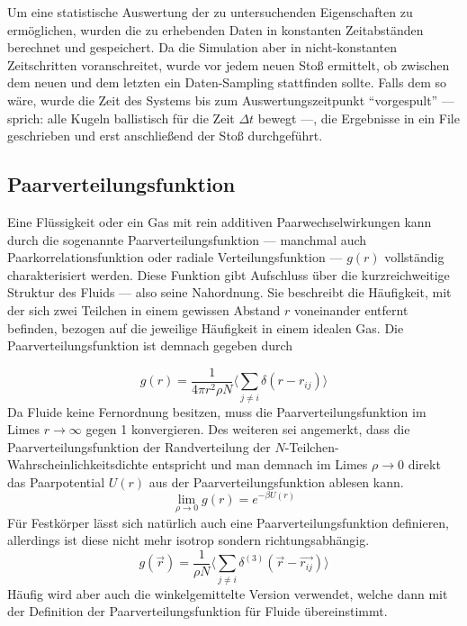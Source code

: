 Um eine statistische Auswertung der zu untersuchenden Eigenschaften zu ermöglichen, wurden die zu erhebenden Daten in konstanten Zeitabständen berechnet und gespeichert. Da die Simulation aber in nicht-konstanten Zeitschritten voranschreitet, wurde vor jedem neuen Stoß ermittelt, ob zwischen dem neuen und dem letzten ein Daten-Sampling stattfinden sollte. Falls dem so wäre, wurde die Zeit des Systems bis zum Auswertungszeitpunkt ``vorgespult'' --- sprich: alle Kugeln ballistisch für die Zeit $\Delta t$ bewegt ---, die Ergebnisse in ein File geschrieben und erst anschließend der Stoß durchgeführt.   
\subsection{Paarverteilungsfunktion}\label{sec:paarverteilung}
Eine Flüssigkeit oder ein Gas mit rein additiven Paarwechselwirkungen kann durch die sogenannte Paarverteilungsfunktion --- manchmal auch Paarkorrelationsfunktion oder radiale Verteilungsfunktion --- $g(r)$ vollständig charakterisiert werden. Diese Funktion gibt Aufschluss über die kurzreichweitige Struktur des Fluids --- also seine Nahordnung. Sie beschreibt die Häufigkeit, mit der sich zwei Teilchen in einem gewissen Abstand $r$ voneinander entfernt befinden, bezogen auf die jeweilige Häufigkeit in einem idealen Gas. Die Paarverteilungsfunktion ist demnach gegeben durch
 
 \begin{equation}
g(r) = \frac{1}{4\pi r^2 \rho N}\langle \sum_{j\neq i} \delta(r-r_{ij}) \rangle
\end{equation}
Da Fluide keine Fernordnung besitzen, muss die Paarverteilungsfunktion im Limes $r \rightarrow \infty$ gegen 1 konvergieren. Des weiteren sei angemerkt, dass die Paarverteilungsfunktion der Randverteilung der $N$-Teilchen-Wahrscheinlichkeitsdichte entspricht und man demnach im Limes $\rho \rightarrow 0$ direkt das Paarpotential $U(r)$ aus der Paarverteilungsfunktion ablesen kann.  
\begin{equation}
\lim_{\rho \rightarrow 0} g(r) = e^{-\beta U(r)}
\end{equation}
Für Festkörper lässt sich natürlich auch eine Paarverteilungsfunktion definieren, allerdings ist diese nicht mehr isotrop sondern richtungsabhängig. 
\begin{equation}
g(\vec{r}) = \frac{1}{\rho N} \langle \sum_{j\neq i} \delta^{(3)}(\vec{r}-\vec{r_{ij}}) \rangle
\end{equation} 
Häufig wird aber auch die winkelgemittelte Version verwendet, welche dann mit der Definition der Paarverteilungsfunktion für Fluide übereinstimmt. 

